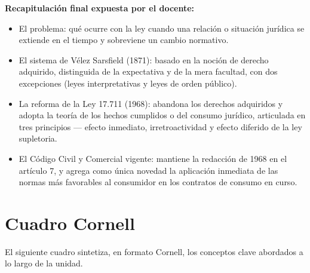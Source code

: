\documentclass[12pt,oneside]{book}
\begin{document}
\begin{note}
\textbf{Recapitulación final expuesta por el docente:}
\begin{itemize}
    \item El problema: qué ocurre con la ley cuando una relación o situación jurídica se extiende en el tiempo y sobreviene un cambio normativo.
    \item El sistema de Vélez Sarsfield (1871): basado en la noción de derecho adquirido, distinguida de la expectativa y de la mera facultad, con dos excepciones (leyes interpretativas y leyes de orden público).
    \item La reforma de la Ley 17.711 (1968): abandona los derechos adquiridos y adopta la teoría de los hechos cumplidos o del consumo jurídico, articulada en tres principios --- efecto inmediato, irretroactividad y efecto diferido de la ley supletoria.
    \item El Código Civil y Comercial vigente: mantiene la redacción de 1968 en el artículo 7, y agrega como única novedad la aplicación inmediata de las normas más favorables al consumidor en los contratos de consumo en curso.
\end{itemize}
\end{note}

\section*{Cuadro Cornell}

El siguiente cuadro sintetiza, en formato Cornell, los conceptos clave abordados a lo largo de la unidad.
\end{document}
